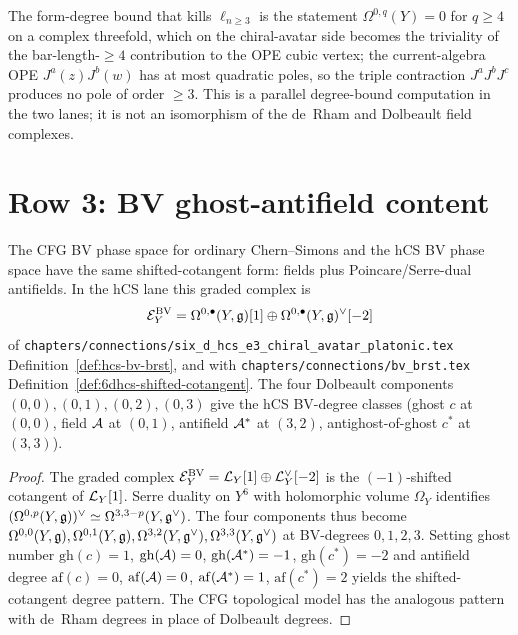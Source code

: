 \begin{remark}
\label{rem:cfg-row-2-cubic-bound}
The form-degree bound that kills $\ell_{n\geq 3}$ is the statement
$\Omega^{0,q}(Y) = 0$ for $q\geq 4$ on a complex threefold, which on
the chiral-avatar side becomes the triviality of the bar-length-$\geq 4$
contribution to the OPE cubic vertex; the current-algebra OPE
$J^a(z)J^b(w)$ has at most quadratic poles, so the triple contraction
$J^a J^b J^c$ produces no pole of order $\geq 3$. This is a parallel
degree-bound computation in the two lanes; it is not an isomorphism of
the de~Rham and Dolbeault field complexes.
\end{remark}

\section{Row 3: BV ghost-antifield content}
\label{sec:cfg-row-3-ghost-antifield}

\begin{theorem}
\label{thm:cfg-row-3}
The CFG BV phase space for ordinary Chern--Simons and the hCS BV phase
space have the same shifted-cotangent form: fields plus
Poincare/Serre-dual antifields. In the hCS lane this graded complex is
\[
 \mathcal{E}^{\mathrm{BV}}_Y
 = \Omega^{0,\bullet}(Y,\mathfrak{g})[1]\oplus \Omega^{0,\bullet}(Y,\mathfrak{g})^\vee[-2]
\]
of
\texttt{chapters/connections/six\_d\_hcs\_e3\_chiral\_avatar\_platonic.tex}
Definition~\ref{def:hcs-bv-brst}, and with
\texttt{chapters/connections/bv\_brst.tex}
Definition~\ref{def:6dhcs-shifted-cotangent}. The four Dolbeault
components $(0,0), (0,1), (0,2), (0,3)$ give the hCS BV-degree classes
(ghost $c$ at $(0,0)$, field $\mathcal{A}$ at $(0,1)$, antifield $\mathcal{A}^*$ at
$(3,2)$, antighost-of-ghost $c^*$ at $(3,3)$).
\end{theorem}

\begin{proof}
The graded complex $\mathcal{E}^{\mathrm{BV}}_Y = \mathcal{L}_Y[1]\oplus \mathcal{L}_Y^\vee[-2]$ is the
$(-1)$-shifted cotangent of $\mathcal{L}_Y[1]$. Serre duality on $Y^6$ with
holomorphic volume $\Omega_Y$ identifies
$(\Omega^{0,p}(Y,\mathfrak{g}))^\vee\simeq \Omega^{3,3-p}(Y,\mathfrak{g}^\vee)$. The
four components thus become
$\Omega^{0,0}(Y,\mathfrak{g}),\Omega^{0,1}(Y,\mathfrak{g}),\Omega^{3,2}(Y,\mathfrak{g}^\vee),\Omega^{3,3}(Y,\mathfrak{g}^\vee)$
at BV-degrees $0, 1, 2, 3$. Setting
ghost number $\mathrm{gh}(c) = 1$, $\mathrm{gh}(\mathcal{A}) = 0$,
$\mathrm{gh}(\mathcal{A}^*) = -1$, $\mathrm{gh}(c^*) = -2$ and antifield degree
$\mathrm{af}(c) = 0$, $\mathrm{af}(\mathcal{A}) = 0$, $\mathrm{af}(\mathcal{A}^*) = 1$,
$\mathrm{af}(c^*) = 2$ yields the shifted-cotangent degree pattern.
The CFG topological model has the analogous pattern with de~Rham
degrees in place of Dolbeault degrees.
\end{proof}

